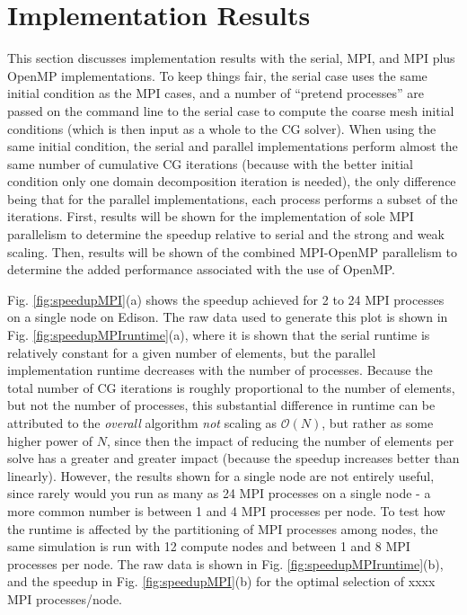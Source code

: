 \documentclass[10pt]{article}
\begin{document}
\section{Implementation Results}
This section discusses implementation results with the serial, MPI, and MPI plus OpenMP implementations. To keep things fair, the serial case uses the same initial condition as the MPI cases, and a number of ``pretend processes'' are passed on the command line to the serial case to compute the coarse mesh initial conditions (which is then input as a whole to the CG solver). When using the same initial condition, the serial and parallel implementations perform almost the same number of cumulative CG iterations (because with the better initial condition only one domain decomposition iteration is needed), the only difference being that for the parallel implementations, each process performs a subset of the iterations. First, results will be shown for the implementation of sole MPI parallelism to determine the speedup relative to serial and the strong and weak scaling. Then, results will be shown of the combined MPI-OpenMP parallelism to determine the added performance associated with the use of OpenMP.





Fig. \ref{fig:speedupMPI}(a) shows the speedup achieved for 2 to 24 MPI processes on a single node on Edison. The raw data used to generate this plot is shown in Fig. \ref{fig:speedupMPIruntime}(a), where it is shown that the serial runtime is relatively constant for a given number of elements, but the parallel implementation runtime decreases with the number of processes. Because the total number of CG iterations is roughly proportional to the number of elements, but not the number of processes, this substantial difference in runtime can be attributed to the {\it overall} algorithm {\it not} scaling as \(\mathscr{O}(N)\), but rather as some higher power of \(N\), since then the impact of reducing the number of elements per solve has a greater and greater impact (because the speedup increases better than linearly). However, the results shown for a single node are not entirely useful, since rarely would you run as many as 24 MPI processes on a single node - a more common number is between 1 and 4 MPI processes per node. To test how the runtime is affected by the partitioning of MPI processes among nodes, the same simulation is run with 12 compute nodes and between 1 and 8 MPI processes per node. The raw data is shown in Fig. \ref{fig:speedupMPIruntime}(b), and the speedup in Fig. \ref{fig:speedupMPI}(b) for the optimal selection of xxxx MPI processes/node.
\end{document}
